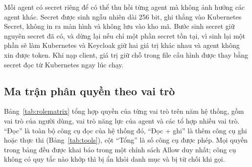 Mỗi agent có secret riêng để có thể thu hồi từng agent mà không ảnh hưởng các agent khác. Secret được sinh ngẫu nhiên dài 256 bit, ghi thẳng vào Kubernetes Secret, không in ra màn hình và không lưu vào kho mã. Bước sinh secret giữ nguyên secret đã có, và dừng lại nếu chỉ một phần secret tồn tại, vì sinh lại một phần sẽ làm Kubernetes và Keycloak giữ hai giá trị khác nhau và agent không xin được token. Khi nạp client, giá trị giữ chỗ trong file cấu hình được thay bằng secret đọc từ Kubernetes ngay lúc chạy.

\subsection{Ma trận phân quyền theo vai trò}\label{sec:rolematrix}

Bảng~\ref{tab:rolematrix} tổng hợp quyền của từng vai trò trên năm hệ thống, gồm vai trò của người dùng, vai trò năng lực của agent và các tổ hợp nhiều vai trò. ``Đọc'' là toàn bộ công cụ đọc của hệ thống đó, ``Đọc + ghi'' là thêm công cụ ghi hoặc thực thi (Bảng~\ref{tab:tools}), cột ``Tổng'' là số công cụ được phép. Mọi quyền trong bảng đều được khai báo trong một chính sách Allow duy nhất; công cụ không có quy tắc nào khớp thì bị ẩn khỏi danh mục và bị từ chối khi gọi.

